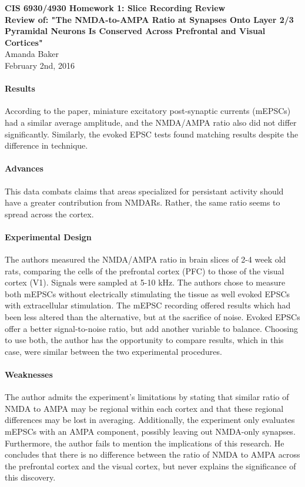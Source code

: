 \documentclass[11pt]{article}
\begin{document}
\begin{center}
{\large {\bf CIS 6930/4930 Homework 1: Slice Recording Review}}\\
{\normalsize {\bf Review of: "The NMDA-to-AMPA Ratio at Synapses Onto Layer 2/3 Pyramidal Neurons
Is Conserved Across Prefrontal and Visual Cortices"}}\\
Amanda Baker \\
February 2nd, 2016 \\
\end{center}

\paragraph{Results}
According to the paper, miniature excitatory post-synaptic currents (mEPSCs) had
a similar average amplitude, and the NMDA/AMPA ratio also did not differ significantly.
Similarly, the evoked EPSC tests found matching results despite the difference in
technique.

\paragraph{Advances}
This data combats claims that areas specialized for persistant activity should have
a greater contribution from NMDARs.  Rather, the same ratio seems to spread across
the cortex.

\paragraph{Experimental Design}
The authors measured the NMDA/AMPA ratio in brain slices of 2-4 week old rats, comparing
the cells of the prefrontal cortex (PFC) to those of the visual cortex (V1).  Signals
were sampled at 5-10 kHz.  The authors chose to measure both mEPSCs without electrically
stimulating the tissue as well evoked EPSCs with extracellular stimulation.  The mEPSC
recording offered results which had been less altered than the alternative, but at
the sacrifice of noise.  Evoked EPSCs offer a better signal-to-noise ratio, but add
another variable to balance.  Choosing to use both, the author has the opportunity
to compare results, which in this case, were similar between the two experimental
procedures.

\paragraph{Weaknesses}
The author admits the experiment's limitations by stating that similar ratio of NMDA
to AMPA may be regional within each cortex and that these regional differences may
be lost in averaging.  Additionally, the experiment only evaluates mEPSCs with an
AMPA component, possibly leaving out NMDA-only synapses.  Furthermore, the author
fails to mention the implications of this research.  He concludes that there is
no difference between the ratio of NMDA to AMPA across the prefrontal cortex and
the visual cortex, but never explains the significance of this discovery.
\end{document}
